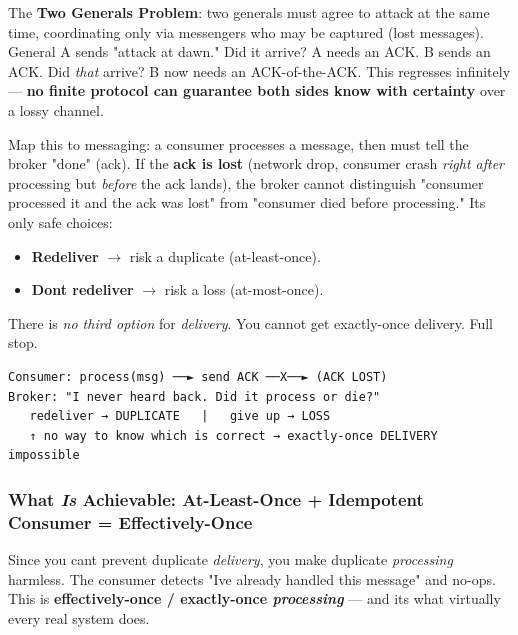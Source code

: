 \documentclass[11pt]{article}
\providecommand{\tightlist}{\setlength{\itemsep}{1pt}\setlength{\parskip}{0pt}}
\begin{document}
The \textbf{Two Generals Problem}: two generals must agree to attack at the same time, coordinating only via messengers who may be captured (lost messages). General A sends "attack at dawn." Did it arrive? A needs an ACK. B sends an ACK. Did \emph{that} arrive? B now needs an ACK-of-the-ACK. This regresses infinitely --- \textbf{no finite protocol can guarantee both sides know with certainty} over a lossy channel.

Map this to messaging: a consumer processes a message, then must tell the broker "done" (ack). If the \textbf{ack is lost} (network drop, consumer crash \emph{right after} processing but \emph{before} the ack lands), the broker cannot distinguish "consumer processed it and the ack was lost" from "consumer died before processing." Its only safe choices:

\begin{itemize}
\tightlist
\item
  \textbf{Redeliver} \(\rightarrow\) risk a duplicate (at-least-once).
\item
  \textbf{Don\textquotesingle t redeliver} \(\rightarrow\) risk a loss (at-most-once).
\end{itemize}

There is \emph{no third option} for \emph{delivery}. You cannot get exactly-once delivery. Full stop.

\setcodelang{}

\begin{verbatim}
Consumer: process(msg) ──► send ACK ──X──► (ACK LOST)
Broker: "I never heard back. Did it process or die?"
   redeliver → DUPLICATE   |   give up → LOSS
   ↑ no way to know which is correct → exactly-once DELIVERY impossible
\end{verbatim}

\subsubsection{\texorpdfstring{What \emph{Is} Achievable: At-Least-Once + Idempotent Consumer = Effectively-Once}{What Is Achievable: At-Least-Once + Idempotent Consumer = Effectively-Once}}\label{what-is-achievable-at-least-once--idempotent-consumer--effectively-once}

Since you can\textquotesingle t prevent duplicate \emph{delivery}, you make duplicate \emph{processing} harmless. The consumer detects "I\textquotesingle ve already handled this message" and no-ops. This is \textbf{effectively-once / exactly-once \emph{processing}} --- and it\textquotesingle s what virtually every real system does.
\end{document}
